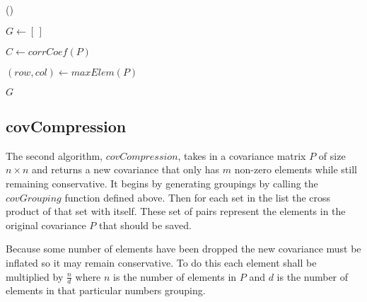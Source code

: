 \documentclass[11pt]{article}
\begin{document}
\begin{algorithm}


\Begin() {
	$G\leftarrow\left[\,\right]$
	
	\BlankLine
	$C\leftarrow corrCoef(P)$
	
	\BlankLine
	$\left(row, col\right)\leftarrow maxElem(P)$
	
	
	
	\Return $G$
}
	
\end{algorithm}

\subsection{covCompression}
The second algorithm, $covCompression$, takes in a covariance matrix $P$ of size $n \times n$ and returns a new covariance that only has $m$ non-zero elements while still remaining conservative. 
It begins by generating groupings by calling the $covGrouping$ function defined above. 
Then for each set in the list the cross product of that set with itself. 
These set of pairs represent the elements in the original covariance $P$ that should be saved. 

Because some number of elements have been dropped the new covariance must be inflated so it may remain conservative. 
To do this each element shall be multiplied by $\frac{n}{d}$ where $n$ is the number of elements in $P$ and $d$ is the number of elements in that particular numbers grouping.  
\end{document}
